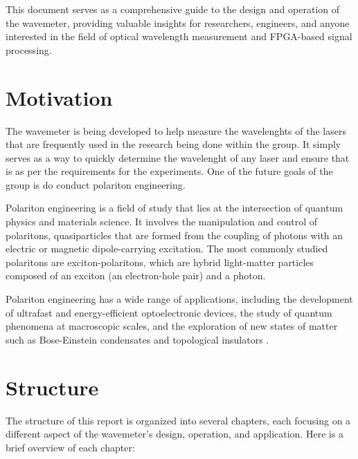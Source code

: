 \documentclass[12pt, twoside]{report}
\begin{document}
\vspace{1em}
This document serves as a comprehensive guide to the design and operation of the wavemeter, providing valuable insights for researchers, engineers, and anyone interested in the field of optical wavelength measurement and FPGA-based signal processing.

\section{Motivation}
The wavemeter is being developed to help measure the wavelenghts of the lasers that are frequently used in the research being done within the group. It simply serves as a way to quickly determine the wavelenght of any laser and ensure that is as per the requirements for the experiments. One of the future goals of the group is do conduct polariton engineering.

\vspace{1em}
Polariton engineering is a field of study that lies at the intersection of quantum physics and materials science. It involves the manipulation and control of polaritons, quasiparticles that are formed from the coupling of photons with an electric or magnetic dipole-carrying excitation. The most commonly studied polaritons are exciton-polaritons, which are hybrid light-matter particles composed of an exciton (an electron-hole pair) and a photon.

\vspace{1em}
Polariton engineering has a wide range of applications, including the development of ultrafast and energy-efficient optoelectronic devices, the study of quantum phenomena at macroscopic scales, and the exploration of new states of matter such as Bose-Einstein condensates and topological insulators \cite{Clark2019}.

\section{Structure}

The structure of this report is organized into several chapters, each focusing on a different aspect of the wavemeter's design, operation, and application. Here is a brief overview of each chapter:
\end{document}
